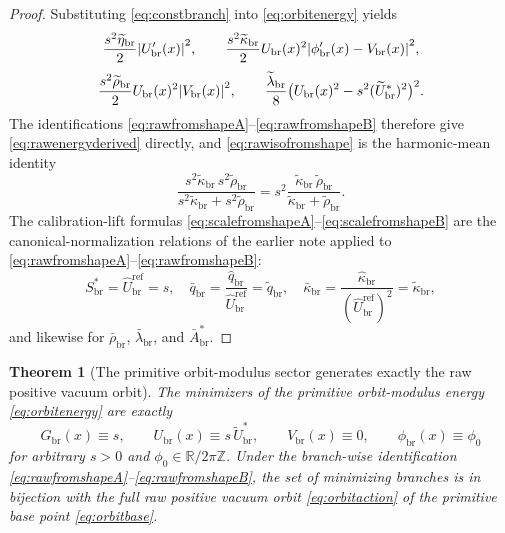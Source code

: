 \documentclass[11pt]{article}
\newcommand{\RespVacAmp}{U_{\mathrm{br}}}
\newcommand{\RespVacPhase}{\phi_{\mathrm{br}}}
\newcommand{\RespVacCarrier}{V_{\mathrm{br}}}
\newcommand{\RespScaleEq}{S_{\mathrm{br}}^{\ast}}
\newcommand{\RespScaleReadout}{\bar q_{\mathrm{br}}}
\newcommand{\RespScaleCov}{\bar\kappa_{\mathrm{br}}}
\newcommand{\RespScaleRelax}{\bar\rho_{\mathrm{br}}}
\newcommand{\RespScaleWell}{\bar\lambda_{\mathrm{br}}}
\newcommand{\RespScaleAmpEq}{\bar A_{\mathrm{br}}^{\ast}}
\newcommand{\RespRawReadout}{\widehat q_{\mathrm{br}}}
\newcommand{\RespRawRef}{\widehat U_{\mathrm{br}}^{\mathrm{ref}}}
\newcommand{\RespRawCov}{\widehat\kappa_{\mathrm{br}}}
\newcommand{\RespShapeReadout}{\widetilde q_{\mathrm{br}}}
\newcommand{\RespShapeCov}{\widetilde\kappa_{\mathrm{br}}}
\newcommand{\RespShapeRelax}{\widetilde\rho_{\mathrm{br}}}
\newcommand{\RespShapeWell}{\widetilde\lambda_{\mathrm{br}}}
\newcommand{\RespShapeEq}{\widetilde U_{\mathrm{br}}^{\ast}}
\newcommand{\RespShapeIso}{\widetilde\eta_{\mathrm{br}}}
\newcommand{\RespOrbitField}{G_{\mathrm{br}}}
\newtheorem{theorem}{Theorem}
\begin{document}
\begin{proof}
Substituting \eqref{eq:constbranch} into \eqref{eq:orbitenergy} yields
\[
\frac{s^2\RespShapeIso}{2}\abs{\RespVacAmp'(x)}^2,
\qquad
\frac{s^2\RespShapeCov}{2}\RespVacAmp(x)^2\abs{\RespVacPhase'(x)-\RespVacCarrier(x)}^2,
\]
\[
\frac{s^2\RespShapeRelax}{2}\RespVacAmp(x)^2\abs{\RespVacCarrier(x)}^2,
\qquad
\frac{\RespShapeWell}{8}\bigl(\RespVacAmp(x)^2-s^2(\RespShapeEq)^2\bigr)^2.
\]
The identifications \eqref{eq:rawfromshapeA}--\eqref{eq:rawfromshapeB} therefore give \eqref{eq:rawenergyderived} directly, and \eqref{eq:rawisofromshape} is the harmonic-mean identity
\[
\frac{s^2\RespShapeCov\,s^2\RespShapeRelax}{s^2\RespShapeCov+s^2\RespShapeRelax}
=
s^2\frac{\RespShapeCov\,\RespShapeRelax}{\RespShapeCov+\RespShapeRelax}.
\]
The calibration-lift formulas \eqref{eq:scalefromshapeA}--\eqref{eq:scalefromshapeB} are the canonical-normalization relations of the earlier note applied to \eqref{eq:rawfromshapeA}--\eqref{eq:rawfromshapeB}:
\[
\RespScaleEq=\RespRawRef=s,
\quad
\RespScaleReadout=\frac{\RespRawReadout}{\RespRawRef}=\RespShapeReadout,
\quad
\RespScaleCov=\frac{\RespRawCov}{(\RespRawRef)^2}=\RespShapeCov,
\]
and likewise for \(\RespScaleRelax\), \(\RespScaleWell\), and \(\RespScaleAmpEq\).
\end{proof}

\begin{theorem}[The primitive orbit-modulus sector generates exactly the raw positive vacuum orbit]
\label{thm:orbitminimizers}
The minimizers of the primitive orbit-modulus energy \eqref{eq:orbitenergy} are exactly
\begin{equation}
\RespOrbitField(x)\equiv s,
\qquad
\RespVacAmp(x)\equiv s\,\RespShapeEq,
\qquad
\RespVacCarrier(x)\equiv0,
\qquad
\RespVacPhase(x)\equiv\phi_0
\label{eq:orbitminimizers}
\end{equation}
for arbitrary \(s>0\) and \(\phi_0\in\mathbb R/2\pi\mathbb Z\). Under the branch-wise identification \eqref{eq:rawfromshapeA}--\eqref{eq:rawfromshapeB}, the set of minimizing branches is in bijection with the full raw positive vacuum orbit \eqref{eq:orbitaction} of the primitive base point \eqref{eq:orbitbase}.
\end{theorem}
\end{document}
